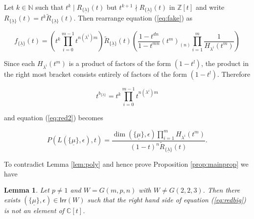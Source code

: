 \documentclass[a4apper,10pt]{amsart}
\newtheorem{lem}[thm]{Lemma}
\theoremstyle{definition}
\numberwithin{thm}{section}
\newcommand{\Z}{\mathbb{Z}}
\newcommand{\N}{\mathbb{N}}
\newcommand{\C}{\mathbb{C}}
\newcommand{\Irr}{\mathsf{Irr}}
\begin{document}
\noindent Let $k \in \N$ such that $t^k \mid R_{ \{
  \underline{\lambda} \}}(t)$ but $t^{k+1} \nmid R_{ \{
  \underline{\lambda} \}}(t)$ in $\Z[t]$ and write $R_{ \{ \underline{\lambda}
  \}}(t) = t^k \tilde{R}_{ \{ \underline{\lambda} \}}(t)$. Then
  rearrange equation (\ref{eq:fake}) as

\begin{equation}
f_{\{ \underline{\lambda} \} }(t) = \left(t^k \prod_{i = 0}^{m-1}
t^{n(\lambda^i)m}\right)\tilde{R}_{\{
  \underline{\lambda} \} }(t) \left( \frac{1 - t^{dn}}{1 - t^{mn}}(t^m)_{(n)} \prod_{i = 1}^m
\frac{1}{H_{\lambda^i} (t^m)}\right)
\end{equation}


\noindent Since each $H_{\lambda^i}(t^m)$ is a product of factors of the form $(1 - t^l)$, the product in the right most bracket consists entirely of factors of the form $(1 - t^l)$. Therefore  

\begin{displaymath}
t^{b_{ \{ \underline{\lambda} \} }} = t^k \prod_{i = 0}^{m-1} t^{n(\lambda^i)m}
\end{displaymath}

\noindent and equation (\ref{eq:red2}) becomes

\begin{equation}\label{eq:redbig}
P(L(\{ \underline{\mu} \},\epsilon),t) = \frac{\dim ( \{
  \underline{\mu} \},\epsilon) \prod_{i = 1}^m H_{\lambda^i}(t^m)}{(1
  - t)^n \tilde{R}_{ \{ \underline{\lambda} \} }(t)}.
\end{equation}

\noindent To contradict Lemma \ref{lem:poly} and hence prove Proposition \ref{prop:mainprop} we have 

\begin{lem}
Let $p \neq 1$ and $W = G(m,p,n)$ with $W \neq G(2,2,3)$. Then there exists $( \{ \underline{\mu} \},\epsilon) \in \Irr(W)$ such that the right hand side of equation (\ref{eq:redbig}) is not an element of $\C[t]$.
\end{lem}
\end{document}
